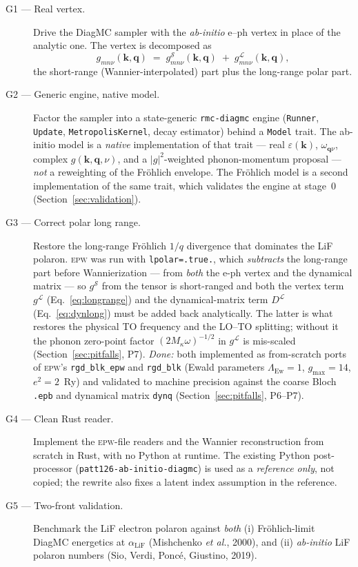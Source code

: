 \documentclass[11pt]{article}
\newcommand{\kv}{\mathbf{k}}
\newcommand{\qv}{\mathbf{q}}
\newcommand{\gshort}{g^{\mathcal{S}}}
\newcommand{\glong}{g^{\mathcal{L}}}
\newcommand{\Dlong}{D^{\mathcal{L}}}
\begin{document}
\begin{description}
  \item[G1 --- Real vertex.] Drive the DiagMC sampler with the \emph{ab-initio} e--ph
    vertex in place of the analytic one. The vertex is decomposed as
    \begin{equation}
      g_{mn\nu}(\kv,\qv) \;=\; \gshort_{mn\nu}(\kv,\qv)\;+\;\glong_{mn\nu}(\kv,\qv),
      \label{eq:split}
    \end{equation}
    the short-range (Wannier-interpolated) part plus the long-range polar part.

  \item[G2 --- Generic engine, native model.] Factor the sampler into a state-generic
    \texttt{rmc-diagmc} engine (\texttt{Runner}, \texttt{Update}, \texttt{MetropolisKernel},
    decay estimator) behind a \texttt{Model} trait. The ab-initio model is a \emph{native}
    implementation of that trait --- real $\varepsilon(\kv)$, $\omega_{\qv\nu}$, complex
    $g(\kv,\qv,\nu)$, and a $|g|^{2}$-weighted phonon-momentum proposal --- \emph{not} a
    reweighting of the Fr\"ohlich envelope. The Fr\"ohlich model is a second implementation of
    the same trait, which validates the engine at stage~0 (Section~\ref{sec:validation}).

  \item[G3 --- Correct polar long range.] Restore the long-range Fr\"ohlich
    $1/q$ divergence that dominates the LiF polaron. \textsc{epw} was run with
    \texttt{lpolar=.true.}, which \emph{subtracts} the long-range part before
    Wannierization --- from \emph{both} the e-ph vertex and the dynamical matrix --- so
    $\gshort$ from the tensor is short-ranged and both the vertex term $\glong$
    (Eq.~\eqref{eq:longrange}) and the dynamical-matrix term $\Dlong$
    (Eq.~\eqref{eq:dynlong}) must be added back analytically. The latter is what restores
    the physical TO frequency and the LO--TO splitting; without it the phonon zero-point
    factor $(2M_{\kappa}\omega)^{-1/2}$ in $\glong$ is mis-scaled (Section~\ref{sec:pitfalls},
    P7). \emph{Done:} both implemented as from-scratch ports of \textsc{epw}'s
    \texttt{rgd\_blk\_epw} and \texttt{rgd\_blk} (Ewald parameters $\Lambda_{\mathrm{Ew}}=1$,
    $g_{\max}=14$, $e^{2}=2$~Ry) and validated to machine precision against the coarse Bloch
    \texttt{.epb} and dynamical matrix \texttt{dynq} (Section~\ref{sec:pitfalls}, P6--P7).

  \item[G4 --- Clean Rust reader.] Implement the \textsc{epw}-file readers and the Wannier
    reconstruction from scratch in Rust, with no Python at runtime. The existing Python
    post-processor (\texttt{patt126-ab-initio-diagmc}) is used as a \emph{reference only},
    not copied; the rewrite also fixes a latent index assumption in the reference.

  \item[G5 --- Two-front validation.] Benchmark the LiF electron polaron against
    \emph{both}
    (i) Fr\"ohlich-limit DiagMC energetics at $\alpha_{\mathrm{LiF}}$
        (Mishchenko \emph{et al.}, 2000), and
    (ii) \emph{ab-initio} LiF polaron numbers
        (Sio, Verdi, Ponc\'e, Giustino, 2019).
\end{description}
\end{document}
